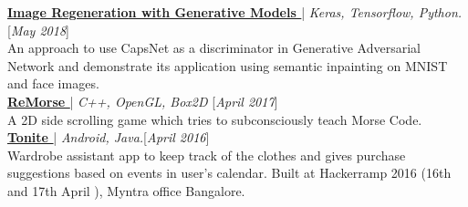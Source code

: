 \documentclass[10pt]{article}
\renewcommand{\textbf}[1]{{\bfseries\color{accent_darkest}#1}}
\begin{document}
\textbf{\underline{\href{https://github.com/RaghavaDhanya/Rudolf}
{Image Regeneration with Generative Models \faExternalLinkSquare}}} | \textit{Keras, Tensorflow, Python.}\hfill\textcolor{grey_darker}{[\textit{May 2018}]}\\
An approach to use CapsNet as a discriminator in Generative Adversarial Network and demonstrate its application using semantic inpainting on MNIST and face images.
\smallskip
\\
\textbf{\underline{\href{https://github.com/RaghavaDhanya/ReMorse}
{ReMorse \faExternalLinkSquare}}}  | \textit{C++, OpenGL, Box2D} \hfill\textcolor{grey_darker}{[\textit{April 2017}]}
\\
A 2D side scrolling game which tries to subconsciously teach Morse Code.
\smallskip
\\
\textbf{\underline{\href{https://github.com/abhijith0505/Tonite}
{Tonite \faExternalLinkSquare}}} | \textit{Android, Java.}\hfill\textcolor{grey_darker}{[\textit{April 2016}]}\\
Wardrobe assistant app to keep track of the clothes and gives purchase
suggestions based on events in user's calendar. Built at Hackerramp
2016 (16th and 17th April ), Myntra office Bangalore.

\end{document}
